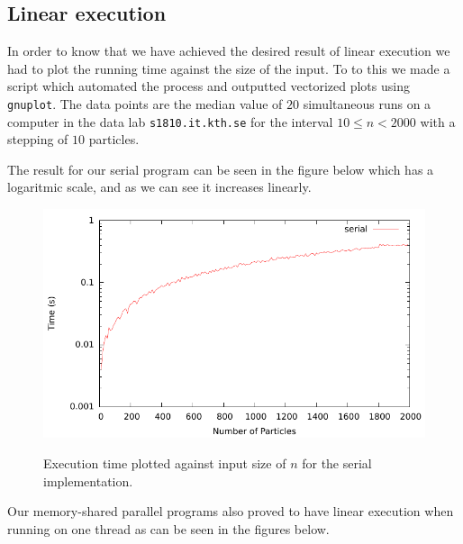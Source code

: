 

\subsection{Linear execution}

In order to know that we have achieved the desired result of linear execution we
had to plot the running time against the size of the input. To to this we made a
script which automated the process and outputted vectorized plots using
\texttt{gnuplot}. The data points are the median value of $20$ simultaneous runs
on a computer in the data lab \texttt{s1810.it.kth.se} for the interval $10 \leq
n < 2000$ with a stepping of $10$ particles.

The result for our serial program can be seen in the figure below which has a
logaritmic scale, and as we can see it increases linearly.

\begin{figure}[H]
	\includegraphics{plots/serial.pdf}
	\label{serial_linear}
	\caption{Execution time plotted against input size of $n$ for the serial implementation.}
\end{figure}

Our memory-shared parallel programs also proved to have linear execution when running on one thread as can be seen in the figures below.


